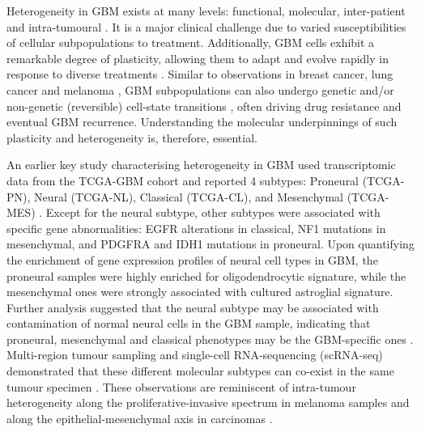 \documentclass[11pt,a4paper]{article}
\begin{document}
Heterogeneity in GBM exists at many levels: functional, molecular, inter-patient and intra-tumoural \parencite{moleculardrugres}. It is a major clinical challenge due to varied susceptibilities of cellular subpopulations to treatment. Additionally, GBM cells exhibit a remarkable degree of plasticity, allowing them to adapt and evolve rapidly in response to diverse treatments \parencite{gbmheteroplast}. Similar to observations in breast cancer, lung cancer and melanoma \parencite{breaster, persisterprogs, resistpersister, diversehomo, melanomaifng, melanomares}, GBM subpopulations can also undergo genetic and/or non-genetic (reversible) cell-state transitions \parencite{diversehomo, tmzplastic, gbmscatlas}, often driving drug resistance and eventual GBM recurrence. Understanding the molecular underpinnings of such plasticity and heterogeneity is, therefore, essential.

An earlier key study characterising heterogeneity in GBM used transcriptomic data from the TCGA-GBM cohort and reported 4 subtypes: Proneural (TCGA-PN), Neural (TCGA-NL), Classical (TCGA-CL), and Mesenchymal (TCGA-MES) \parencite{Verhaak}. Except for the neural subtype, other subtypes were associated with specific gene abnormalities: EGFR alterations in classical, NF1 mutations in mesenchymal, and PDGFRA and IDH1 mutations in proneural. Upon quantifying the enrichment of gene expression profiles of neural cell types in GBM, the proneural samples were highly enriched for oligodendrocytic signature, while the mesenchymal ones were strongly associated with cultured astroglial signature. Further analysis suggested that the neural subtype may be associated with contamination of normal neural cells in the GBM sample, indicating that proneural, mesenchymal and classical phenotypes may be the GBM-specific ones \parencite{neuralfake, margincompos}. Multi-region tumour sampling and single-cell RNA-sequencing (scRNA-seq) demonstrated that these different molecular subtypes can co-exist in the same tumour specimen \parencite{patelscrna, intratumor, margincompos}. These observations are reminiscent of intra-tumour heterogeneity along the proliferative-invasive spectrum in melanoma samples \parencite{melanomalandscape} and along the epithelial-mesenchymal axis in carcinomas \parencite{emtplastic,cschetero,emthetero}.
\end{document}

